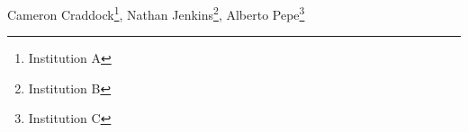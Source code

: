 Cameron Craddock\footnote{Institution A},
Nathan Jenkins\footnote{Institution B},
Alberto Pepe\footnote{Institution C} 